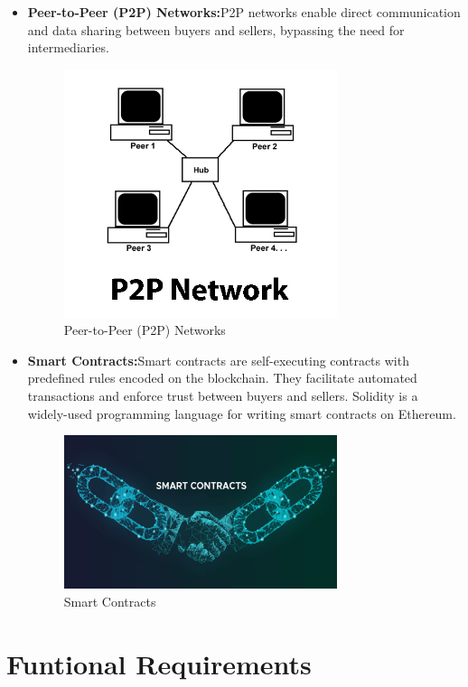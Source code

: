 \documentclass{report}
\begin{document}
\begin{itemize}
    \item \textbf{Peer-to-Peer (P2P) Networks:}P2P networks enable direct communication and data sharing between buyers and sellers, bypassing the need for intermediaries. 
 \begin{figure}[H]
        \centering
        \includegraphics[width=8cm]{tools/peertopeer.jpg}
        \caption{Peer-to-Peer (P2P) Networks}
        \label{fig:enter-label}
    \end{figure}
    
\item \textbf{Smart Contracts:}Smart contracts are self-executing contracts with predefined rules encoded on the blockchain. They facilitate automated transactions and enforce trust between buyers and sellers. Solidity is a widely-used programming language for writing smart contracts on Ethereum.
 \begin{figure}[H]
        \centering
        \includegraphics[width=8cm]{tools/smart-contract-featured-image-1.png}
        \caption{Smart Contracts}
        \label{fig:enter-label}
    \end{figure}

\end{itemize}

\section{Funtional Requirements}
\end{document}
